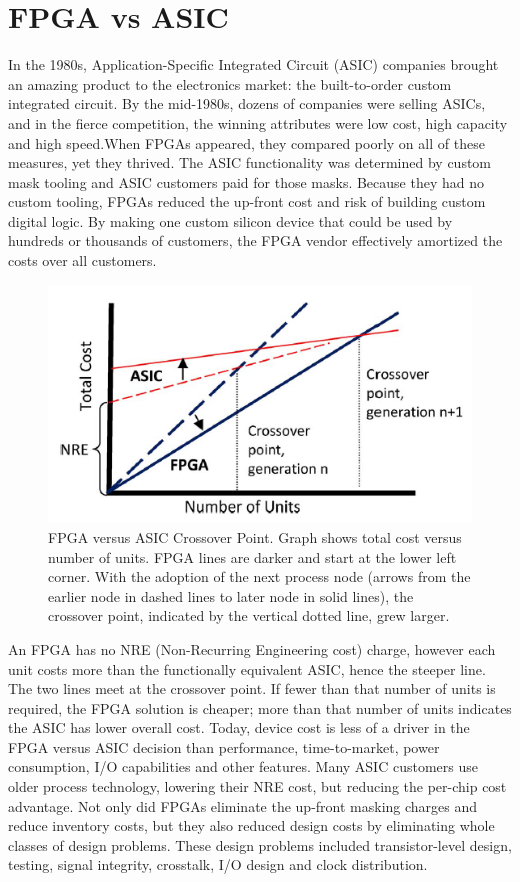 \newpage
\section{FPGA vs ASIC}
\noindent In the 1980s, Application-Specific Integrated Circuit
(ASIC) companies brought an amazing product to the
electronics market: the built-to-order custom integrated
circuit. By the mid-1980s, dozens of companies were selling
ASICs, and in the fierce competition, the winning attributes
were low cost, high capacity and high speed.When
FPGAs appeared, they compared poorly on all of these
measures, yet they thrived. The ASIC functionality was determined by custom mask
tooling and ASIC customers paid for those masks.
Because they had no custom tooling, FPGAs reduced the up-front
cost and risk of building custom digital logic. By making
one custom silicon device that could be used by hundreds or
thousands of customers, the FPGA vendor effectively
amortized the costs over all customers.
\begin{figure}[H]
	\centering
	\includegraphics[width=0.75\linewidth]{IMG/ch3/COST}
	\caption{FPGA versus ASIC Crossover Point. Graph shows total cost
		versus number of units. FPGA lines are darker and start at the lower
		left corner. With the adoption of the next process node (arrows
		from the earlier node in dashed lines to later node in solid lines),
		the crossover point, indicated by the vertical dotted line, grew larger.}
	\label{fig:cost}
\end{figure}     
\noindent  An FPGA has no NRE (Non-Recurring Engineering cost) charge, however each unit costs more than the
functionally equivalent ASIC, hence the steeper line. The
two lines meet at the crossover point. If fewer than that
number of units is required, the FPGA solution is cheaper;
more than that number of units indicates the ASIC has
lower overall cost.
\newline
Today, device cost is less of a driver in the FPGA
versus ASIC decision than performance, time-to-market,
power consumption, I/O capabilities and other features. Many ASIC customers use older process technology,
lowering their NRE cost, but reducing the per-chip cost
advantage. Not only did FPGAs eliminate the up-front masking
charges and reduce inventory costs, but they also reduced
design costs by eliminating whole classes of design problems.
These design problems included transistor-level design,
testing, signal integrity, crosstalk, I/O design and
clock distribution.

